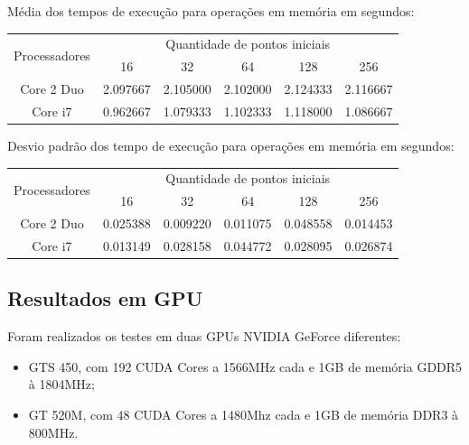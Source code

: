     \hspace{1mm}\newline
    
    \noindent Média dos tempos de execução para operações em memória em segundos:\\
    \begin{tabular}{| c | c | c | c | c | c |}
      \hline
      \multirow{2}{*}{Processadores}& \multicolumn{5}{|c|}{Quantidade de pontos iniciais} \\ \cline{2-6}
      & 16 & 32 & 64 & 128 & 256 \\ \hline
      Core 2 Duo & 2.097667 & 2.105000 & 2.102000 & 2.124333 & 2.116667 \\ \hline
      Core i7 & 0.962667 & 1.079333 & 1.102333 & 1.118000 & 1.086667\\ \hline

      \hline
    \end{tabular}
    
    \hspace{1mm}\newline
    
    \noindent Desvio padrão dos tempo de execução para operações em memória em segundos:\\
    \begin{tabular}{| c | c | c | c | c | c |}
      \hline
      \multirow{2}{*}{Processadores}& \multicolumn{5}{|c|}{Quantidade de pontos iniciais} \\ \cline{2-6}
      & 16 & 32 & 64 & 128 & 256 \\ \hline
      Core 2 Duo & 0.025388 & 0.009220 & 0.011075 & 0.048558 & 0.014453 \\ \hline
      Core i7 & 0.013149 & 0.028158 & 0.044772 & 0.028095 & 0.026874 \\ \hline

      \hline
    \end{tabular}

  \subsection{Resultados em GPU}
    Foram realizados os testes em duas GPUs NVIDIA GeForce diferentes:
  \begin{itemize}
    \item GTS 450, com 192 CUDA Cores a 1566MHz cada e 1GB de memória GDDR5 à 1804MHz;
    \item GT 520M, com 48 CUDA Cores a 1480Mhz cada e 1GB de memória DDR3 à 800MHz.
  \end{itemize}
  

